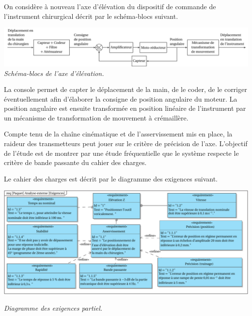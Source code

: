 \documentclass[10pt,fleqn]{article} %
\begin{document}
 On considère à nouveau l'axe d'élévation du dispositif de commande de l'instrument chirurgical décrit par le schéma-blocs suivant.

\begin{center}%
	\includegraphics[width=\linewidth]{images2/schema_bloc}
	\textit{Schéma-blocs de l'axe d'élévation.}
\end{center}

La console permet de capter le déplacement de la main, de le coder, de le corriger éventuellement afin d'élaborer la consigne de position angulaire du moteur. La position angulaire est ensuite transformée en position linéaire de l'instrument par un mécanisme de transformation de mouvement à crémaillère.

\begin{obj}
Compte tenu de la chaîne cinématique et de l'asservissement mis en place, la raideur des transmetteurs peut jouer sur le critère de précision de l'axe. L'objectif de l'étude est de montrer par une étude fréquentielle que le système respecte le critère de bande passante du cahier des charges.
\end{obj}

Le cahier des charges est décrit par le diagramme des exigences suivant.


\begin{center}%
\centering

\includegraphics[width=\linewidth]{images2/Diagramme_exigences}

\textit{Diagramme des exigences partiel.}
\end{center}
\end{document}
